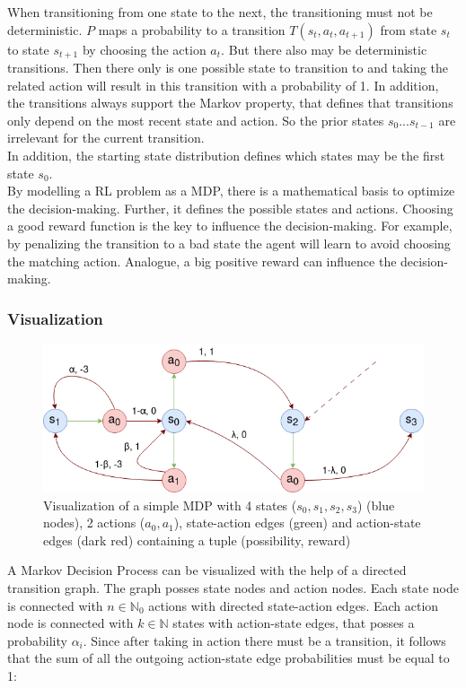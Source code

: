 When transitioning from one state to the next, the transitioning must not be deterministic. 
$P$ maps a probability to a transition $T(s_t,a_t,a_{t+1})$ from state $s_t$ to state $s_{t+1}$ by choosing the action $a_t$. 
But there also may be deterministic transitions. 
Then there only is one possible state to transition to and taking the related action will result in this transition with a probability of 1. 
In addition, the transitions always support the Markov property, that defines that transitions only depend on the most recent state and action. 
So the prior states $s_0 ... s_{t-1}$ are irrelevant for the current transition.\\
In addition, the starting state distribution defines which states may be the first state $s_0$. \\
\newline
By modelling a RL problem as a MDP, there is a mathematical basis to optimize the decision-making. 
Further, it defines the possible states and actions. Choosing a good reward function is the key to influence the decision-making. 
For example, by penalizing the transition to a bad state the agent will learn to avoid choosing the matching action. 
Analogue, a big positive reward can influence the decision-making.

\newpage

\subsubsection{Visualization}
\begin{figure}
	\centering
	\includegraphics[width=\linewidth]{figures/visMdp.png}
	\caption{Visualization of a simple MDP with 4 states ($s_0, s_1, s_2, s_3$) (blue nodes), 2 actions ($a_0, a_1$), 
	state-action edges (green) and action-state edges (dark red) containing a tuple (possibility, reward)}
	\label{fig:vismdp}
\end{figure}
A Markov Decision Process can be visualized with the help of a directed transition graph. 
The graph posses state nodes and action nodes. 
Each state node is connected with $n \in \mathbb{N}_0$ actions with directed state-action edges. 
Each action node is connected with $k \in \mathbb{N}$ states with action-state edges, that posses a probability $\alpha_i$. 
Since after taking in action there must be a transition, it follows that the sum of all the outgoing action-state edge probabilities must be equal to 1:

